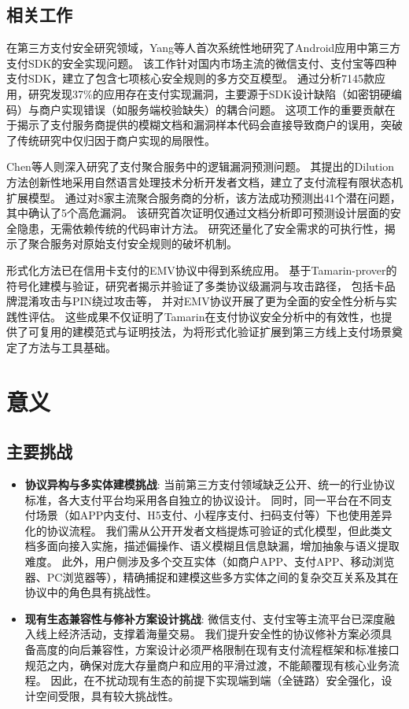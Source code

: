 \documentclass[UTF8]{ctexart}
\begin{document}
\subsection{相关工作}
在第三方支付安全研究领域，Yang等人\cite{YangZLLWZG17-show-me-the-money}首次系统性地研究了Android应用中第三方支付SDK的安全实现问题。
该工作针对国内市场主流的微信支付、支付宝等四种支付SDK，建立了包含七项核心安全规则的多方交互模型。
通过分析7145款应用，研究发现37\%的应用存在支付实现漏洞，主要源于SDK设计缺陷（如密钥硬编码）与商户实现错误（如服务端校验缺失）的耦合问题。
这项工作的重要贡献在于揭示了支付服务商提供的模糊文档和漏洞样本代码会直接导致商户的误用，突破了传统研究中仅归因于商户实现的局限性。

Chen等人\cite{ChenXQL00Z19-devils-in-guidance}则深入研究了支付聚合服务中的逻辑漏洞预测问题。
其提出的Dilution方法创新性地采用自然语言处理技术分析开发者文档，建立了支付流程有限状态机扩展模型。
通过对8家主流聚合服务商的分析，该方法成功预测出41个潜在问题，其中确认了5个高危漏洞。
该研究首次证明仅通过文档分析即可预测设计层面的安全隐患，无需依赖传统的代码审计方法。
研究还量化了安全需求的可执行性，揭示了聚合服务对原始支付安全规则的破坏机制。

形式化方法已在信用卡支付的EMV协议中得到系统应用。
基于Tamarin-prover的符号化建模与验证，研究者揭示并验证了多类协议级漏洞与攻击路径，
包括卡品牌混淆攻击与PIN绕过攻击等\cite{DavidBasin-CardBrandMixupAttack,DavidBasin-PINBypassAttack}，
并对EMV协议开展了更为全面的安全性分析与实践性评估\cite{Radu-Practical-2022,basin_emv_2021}。
这些成果不仅证明了Tamarin在支付协议安全分析中的有效性，也提供了可复用的建模范式与证明技法，为将形式化验证扩展到第三方线上支付场景奠定了方法与工具基础。

\section{意义} 
\subsection{主要挑战}
\begin{itemize}
    \item \textbf{协议异构与多实体建模挑战}:
        当前第三方支付领域缺乏公开、统一的行业协议标准，各大支付平台均采用各自独立的协议设计。
        同时，同一平台在不同支付场景（如APP内支付、H5支付、小程序支付、扫码支付等）下也使用差异化的协议流程。
        我们需从公开开发者文档提炼可验证的式化模型，但此类文档多面向接入实施，描述偏操作、语义模糊且信息缺漏，增加抽象与语义提取难度。
        此外，用户侧涉及多个交互实体（如商户APP、支付APP、移动浏览器、PC浏览器等），精确捕捉和建模这些多方实体之间的复杂交互关系及其在协议中的角色具有挑战性。
    \item \textbf{现有生态兼容性与修补方案设计挑战}:
        微信支付、支付宝等主流平台已深度融入线上经济活动，支撑着海量交易。
        我们提升安全性的协议修补方案必须具备高度的向后兼容性，方案设计必须严格限制在现有支付流程框架和标准接口规范之内，确保对庞大存量商户和应用的平滑过渡，不能颠覆现有核心业务流程。
        因此，在不扰动现有生态的前提下实现端到端（全链路）安全强化，设计空间受限，具有较大挑战性。
\end{itemize}
\end{document}
